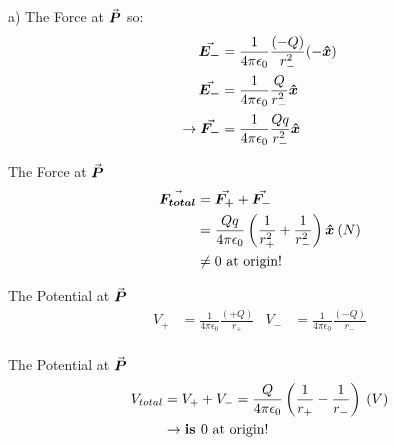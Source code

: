 \documentclass{beamer}
\newcommand{\kk}{\frac{1}{4\pi\epsilon_0}}
\begin{document}
\begin{frame}{a) The Force at $ \va*{P}$}
\Large
	\centering so:
	\begin{align*}
		\va*{E_{-}} &= \frac{1}{4 \pi \epsilon_0} \frac{\left( -Q \right)}{r_{-}^{2}} (-\vu*{x}) \\
		\va*{E_{-}} &= \frac{1}{4 \pi \epsilon_0} \frac{Q }{r_{-}^{2}} \vu*{x}\\
		\rightarrow \va*{F_{-}} &= \frac{1}{4 \pi \epsilon_0} \frac{Q q}{r_{-}^{2}} \vu*{x}  
	\end{align*}
\end{frame}
\begin{frame}{The Force at $\va*{P}$}
	\Large 
	\begin{align*}
		\va*{F_{total}} &= \va*{F_{+}} + \va*{F_{-}} \\
		&= \frac{Qq}{4\pi \epsilon_0} \left( \frac{1}{r_{+}^{2}} + \frac{1}{r_{-}^{2}}   \right)\vu*{x} \: (N)\\
		&\neq 0 \text{ at origin!}
	\end{align*}
\end{frame}
\begin{frame}{The Potential at $ \va*{P}$}
\Large
	\begin{align*}
		V_{+} &= \kk{} \frac{\left( +Q \right)}{r_{+}}  &V_{-} &= \kk \frac{\left( -Q \right)}{r_{-}}\\  
	\end{align*}
\end{frame}
\begin{frame}{The Potential at $ \va*{P}$}
	\Large
	\begin{align*}
		V_{total} &=  V_{+}+V_{-} = \frac{Q}{4\pi\epsilon_0}\left( \frac{1}{r_{+}}- \frac{1}{r_{-}}   \right) \: (V) \\
		&\rightarrow \text{\textbf{is }} 0 \text{ at origin!}
	\end{align*}
\end{frame}
\end{document}
